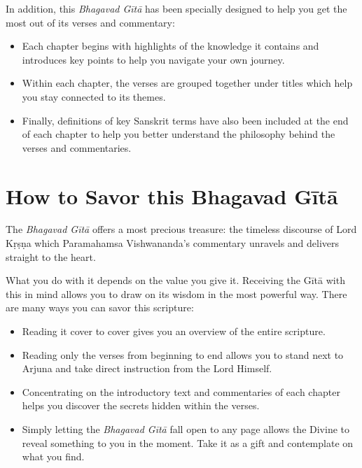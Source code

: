 \documentclass[12pt, twoside, openright]{memoir}
\begin{document}
In addition, this \textit{Bhagavad Gītā} has been specially designed to help you get the most out of its verses and commentary:
\begin{itemize}[itemsep=1pt, topsep=6pt]
    \item Each chapter begins with highlights of the knowledge it contains and introduces key points to help you navigate your own journey.

    \item Within each chapter, the verses are grouped together under titles which help you stay connected to its themes.

    \item Finally, definitions of key Sanskrit terms have also been included at the end of each chapter to help you better understand the philosophy behind the verses and commentaries.
\end{itemize}

\section{How to Savor this Bhagavad Gītā}\label{sec-how-to-savor-this-bhagavad-gita}

The \textit{Bhagavad Gītā} offers a most precious treasure: the timeless discourse of Lord Kṛṣṇa which Paramahamsa Vishwananda’s commentary unravels and delivers straight to the heart. 

What you do with it depends on the value you give it. Receiving the Gītā with this in mind allows you to draw on its wisdom in the most powerful way. There are many ways you can savor this scripture: 

\begin{itemize}[itemsep=1pt, topsep=6pt]

\item Reading it cover to cover gives you an overview of the entire scripture. 

\item Reading only the verses from beginning to end allows you to stand next to Arjuna and take direct instruction from the Lord Himself. 

\item Concentrating on the introductory text and commentaries of each chapter helps you discover the secrets hidden within the verses. 

\item Simply letting the \textit{Bhagavad Gītā} fall open to any page allows the Divine to reveal something to you in the moment. Take it as a gift and contemplate on what you find. 

\end{itemize}
\end{document}
